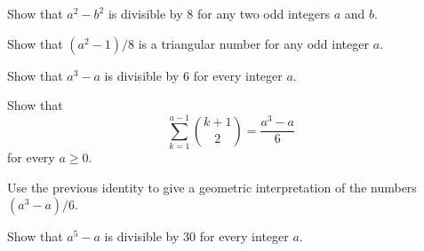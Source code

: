 \begin{routine}
  \exercise 
  \begin{subexenum}
  \item Show that $a^2-b^2$ is divisible by $8$ for any two odd integers $a$ and $b$.
  \item Show that $(a^2-1)/8$ is a triangular number for any odd integer $a$.
  \end{subexenum}
  \exercise
  \label{exercise:div-third-power-minus-first-power}
  \begin{subexenum}
  \item Show that $a^3-a$ is divisible by $6$ for every integer $a$.
  \item Show that
    \begin{equation*}
      \sum_{k=1}^{a-1}\binom{k+1}{2}=\frac{a^3-a}{6}
    \end{equation*}
    for every $a\geq 0$.
  \item Use the previous identity to give a geometric interpretation of the numbers $(a^3-a)/6$.
  \end{subexenum}
  \exercise
  \label{exercise:div-fifth-power-minus-first-power}
  Show that $a^5-a$ is divisible by $30$ for every integer $a$.  
\end{routine}

